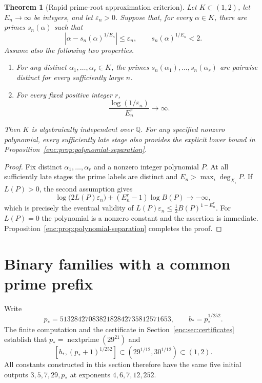 \documentclass[11pt,a4paper]{article}
\newtheorem{theorem}{Theorem}[section]
\theoremstyle{definition}
\theoremstyle{remark}
\numberwithin{equation}{section}
\begin{document}
\begin{theorem}[Rapid prime-root approximation criterion]
\label{enc:thm:approximation-criterion}
Let $K\subset(1,2)$, let $E_n\to\infty$ be integers, and let
$\varepsilon_n>0$.  Suppose that, for every $\alpha\in K$, there are primes
$s_n(\alpha)$ such that
\[
 \left|\alpha-s_n(\alpha)^{1/E_n}\right|\le\varepsilon_n,
 \qquad s_n(\alpha)^{1/E_n}<2.
\]
Assume also the following two properties.
\begin{enumerate}
 \item For any distinct $\alpha_1,\ldots,\alpha_r\in K$, the primes
 $s_n(\alpha_1),\ldots,s_n(\alpha_r)$ are pairwise distinct for every
 sufficiently large $n$.
 \item For every fixed positive integer $r$,
 \[
 \frac{\log(1/\varepsilon_n)}{E_n^r}\longrightarrow\infty.
 \]
\end{enumerate}
Then $K$ is algebraically independent over $\mathbb Q$.
For any specified nonzero polynomial, every sufficiently late stage also
provides the explicit lower bound in
Proposition~\ref{enc:prop:polynomial-separation}.
\end{theorem}

\begin{proof}
Fix distinct $\alpha_1,\ldots,\alpha_r$ and a nonzero integer polynomial
$P$.  At all sufficiently late stages the prime labels are distinct and
$E_n>\max_i\deg_{X_i}P$.  If $L(P)>0$, the second assumption gives
\[
 \log\bigl(2L(P)\varepsilon_n\bigr)
 +(E_n^r-1)\log B(P)\longrightarrow-\infty,
\]
which is precisely the eventual validity of
$L(P)\varepsilon_n\le\frac12B(P)^{1-E_n^r}$.
For $L(P)=0$ the polynomial is a nonzero constant and the assertion is
immediate.  Proposition~\ref{enc:prop:polynomial-separation} completes the proof.
\end{proof}

\section{Binary families with a common prime prefix}
\label{enc:sec:binary-families}

Write
\[
 p_*=5132842708382182842735812571653,
 \qquad b_*=p_*^{1/252}.
\]
The finite computation and the certificate in Section~\ref{enc:sec:certificates} establish
that $p_*=\operatorname{nextprime}(29^{21})$ and
\begin{equation}
\label{enc:eq:seed-location-theory}
 [b_*,(p_*+1)^{1/252}]
 \subset (29^{1/12},30^{1/12})\subset(1,2).
\end{equation}
All constants constructed in this section therefore have the same five
initial outputs $3,5,7,29,p_*$ at exponents $4,6,7,12,252$.
\end{document}
